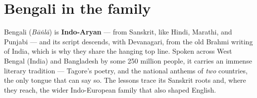 \section*{Bengali in the family}

Bengali (\emph{Bāṅlā}) is \textbf{Indo-Aryan} — from Sanskrit, like Hindi, Marathi, and Punjabi — and its script descends, with Devanagari, from the old Brahmi writing of India, which is why they share the hanging top line. Spoken across West Bengal (India) and Bangladesh by some 250 million people, it carries an immense literary tradition — Tagore's poetry, and the national anthems of \emph{two} countries, the only tongue that can say so. The lessons trace its Sanskrit roots and, where they reach, the wider Indo-European family that also shaped English.
